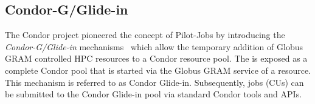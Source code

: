 \documentclass[conference]{IEEEtran}
\begin{document}
\subsection{Condor-G/Glide-in}

The Condor project pioneered the concept of Pilot-Jobs by introducing the
\textit{Condor-G/Glide-in} mechanisms~\cite{condor-g} which allow the
temporary addition of Globus GRAM controlled HPC resources to a Condor
resource pool. The \pilot is exposed as a complete Condor
pool that is started via the Globus GRAM service of a resource. This mechanism
is referred to as Condor Glide-in. Subsequently, jobs (CUs) can be submitted
to the Condor Glide-in pool via standard Condor tools and APIs.

% 

\end{document}
